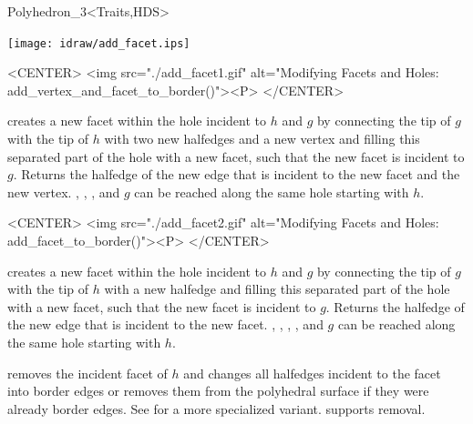 \begin{ccClassTemplate}{Polyhedron_3<Traits,HDS>}
\begin{ccTexOnly}
    \begin{center}
      \parbox{\textwidth}{%
          \texttt{[image: idraw/add\_facet.ips]}%
      }
    \end{center}
\end{ccTexOnly}

\begin{ccHtmlOnly}
    <CENTER>
    <img src="./add_facet1.gif" 
     alt="Modifying Facets and Holes: add_vertex_and_facet_to_border()"><P>
    </CENTER>
\end{ccHtmlOnly}


   {creates a new facet within the hole incident to $h$
   and $g$ by connecting the tip of $g$ with the tip of $h$ 
   with two new halfedges and a new vertex and filling this separated
   part of the hole with a new facet, such that the new facet is
   incident to $g$. Returns the halfedge of the new edge that is
   incident to the new facet and the new vertex.
    \ccPrecond {}, , , 
    and $g$ can be reached along the same hole starting with $h$.}

\begin{ccHtmlOnly}
    <CENTER>
    <img src="./add_facet2.gif" 
     alt="Modifying Facets and Holes: add_facet_to_border()"><P>
    </CENTER>
\end{ccHtmlOnly}

   {creates a new facet within the hole incident to $h$
   and $g$ by connecting the tip of $g$ with the tip of $h$ 
   with a new halfedge and filling this separated part
   of the hole with a new facet, such that the new
   facet is incident to $g$. Returns the halfedge of the new edge that
   is incident to the new facet.
   \ccPrecond {}, , , 
   , and $g$ can be reached along the same hole
   starting with $h$.}



    {removes the incident facet of $h$ and changes all halfedges incident 
     to the facet into border edges or removes them from the
     polyhedral surface if they were already border edges.
     See  for a more specialized variant.    
     \ccPrecond {} supports removal.}


\end{ccClassTemplate}
